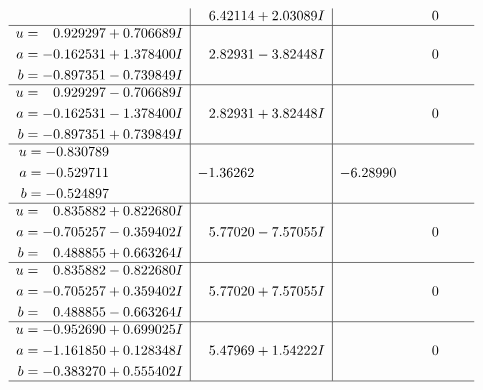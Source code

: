 \documentclass[1p]{elsarticle_modified}
\theoremstyle{definition}
\begin{document}
$$\begin{array}{c|c|c}
 & \phantom{-}6.42114 + 2.03089 I & \phantom{-0.000000 } 0 \\ \hline\begin{aligned}
u &= \phantom{-}0.929297 + 0.706689 I \\
a &= -0.162531 + 1.378400 I \\
b &= -0.897351 - 0.739849 I\end{aligned}
 & \phantom{-}2.82931 - 3.82448 I & \phantom{-0.000000 } 0 \\ \hline\begin{aligned}
u &= \phantom{-}0.929297 - 0.706689 I \\
a &= -0.162531 - 1.378400 I \\
b &= -0.897351 + 0.739849 I\end{aligned}
 & \phantom{-}2.82931 + 3.82448 I & \phantom{-0.000000 } 0 \\ \hline\begin{aligned}
u &= -0.830789\phantom{ +0.000000I} \\
a &= -0.529711\phantom{ +0.000000I} \\
b &= -0.524897\phantom{ +0.000000I}\end{aligned}
 & -1.36262\phantom{ +0.000000I} & -6.28990\phantom{ +0.000000I} \\ \hline\begin{aligned}
u &= \phantom{-}0.835882 + 0.822680 I \\
a &= -0.705257 - 0.359402 I \\
b &= \phantom{-}0.488855 + 0.663264 I\end{aligned}
 & \phantom{-}5.77020 - 7.57055 I & \phantom{-0.000000 } 0 \\ \hline\begin{aligned}
u &= \phantom{-}0.835882 - 0.822680 I \\
a &= -0.705257 + 0.359402 I \\
b &= \phantom{-}0.488855 - 0.663264 I\end{aligned}
 & \phantom{-}5.77020 + 7.57055 I & \phantom{-0.000000 } 0 \\ \hline\begin{aligned}
u &= -0.952690 + 0.699025 I \\
a &= -1.161850 + 0.128348 I \\
b &= -0.383270 + 0.555402 I\end{aligned}
 & \phantom{-}5.47969 + 1.54222 I & \phantom{-0.000000 } 0\\
 \hline 
 \end{array}$$\newpage$$\begin{array}{c|c|c}  

\end{array}$$
\end{document}
